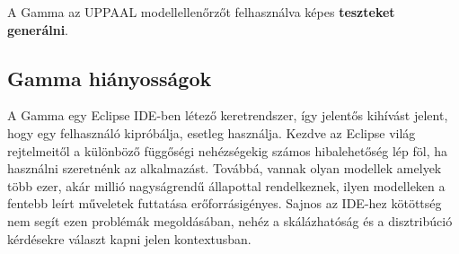 A Gamma az UPPAAL modellellenőrzőt felhasználva képes \textbf{teszteket generálni}.
\subsection{Gamma hiányosságok} \label{gamma_missing}

A Gamma egy Eclipse IDE-ben létező keretrendszer, így jelentős kihívást jelent, hogy egy felhasználó kipróbálja, esetleg használja. Kezdve az Eclipse világ rejtelmeitől a különböző függőségi nehézségekig számos hibalehetőség lép föl, ha használni szeretnénk az alkalmazást. Továbbá, vannak olyan modellek amelyek több ezer, akár millió nagyságrendű állapottal rendelkeznek, ilyen modelleken a fentebb leírt műveletek futtatása erőforrásigényes. Sajnos az IDE-hez kötöttség nem segít ezen problémák megoldásában, nehéz a skálázhatóság és a disztribúció kérdésekre választ kapni jelen kontextusban.













